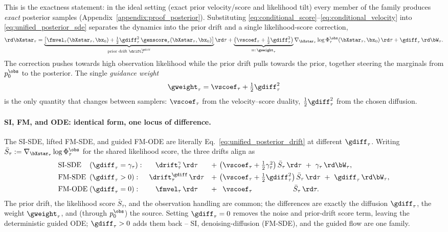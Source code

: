 This is the exactness statement: in the ideal setting (exact prior velocity/score and likelihood tilt) every member of the family produces \emph{exact} posterior samples (Appendix~\ref{appendix:proof_posterior}). Substituting \eqref{eq:conditional_score}--\eqref{eq:conditional_velocity} into \eqref{eq:unified_posterior_sde} separates the dynamics into the prior drift and a single likelihood-score correction,
\begin{align}\label{eq:unified_posterior_drift}
    \rd\bXstar_\tau
    = \underbrace{\left[\fmvel_\tau(\bXstar_\tau,\bx_0) + \tfrac12\gdiff_\tau^2\,\genscore_\tau(\bXstar_\tau,\bx_0)\right]}_{\text{prior drift }\drift^{\gdiff}_\tau}\rd\tau
    + \underbrace{\left(\vscoef_\tau + \tfrac12\gdiff_\tau^2\right)}_{=:\,\gweight_\tau}\nabla_{\bXstar_\tau}\log\Phi_\tau^{\obs}(\bXstar_\tau,\bx_0)\,\rd\tau
    + \gdiff_\tau\,\rd\bW_\tau .
\end{align}
The correction pushes towards high observation likelihood while the prior drift pulls towards the prior, together steering the marginals from $p_0^{\obs}$ to the posterior. The single \emph{guidance weight}
\begin{align}\label{eq:guidance_weight}
    \gweight_\tau = \vscoef_\tau + \tfrac12\gdiff_\tau^2
\end{align}
is the only quantity that changes between samplers: $\vscoef_\tau$ from the velocity--score duality, $\tfrac12\gdiff_\tau^2$ from the chosen diffusion.

\paragraph{SI, FM, and ODE: identical form, one locus of difference.}
The SI-SDE, lifted FM-SDE, and guided FM-ODE are literally Eq.~\eqref{eq:unified_posterior_drift} at different $\gdiff_\tau$. Writing $\bar S_\tau:=\nabla_{\bXstar_\tau}\log\Phi_\tau^{\obs}$ for the shared likelihood score, the three drifts align as
\begin{align}\label{eq:three_drifts}
\begin{array}{l@{\;}l@{\quad}c@{\quad}l}
\text{SI-SDE} &(\gdiff_\tau=\gamma_\tau): &
  \drift^{\gamma}_\tau\,\rd\tau
  &+\ \big(\vscoef_\tau+\tfrac12\gamma_\tau^2\big)\,\bar S_\tau\,\rd\tau\ +\ \gamma_\tau\,\rd\bW_\tau, \\[4pt]
\text{FM-SDE} &(\gdiff_\tau>0): &
  \drift^{\gdiff}_\tau\,\rd\tau
  &+\ \big(\vscoef_\tau+\tfrac12\gdiff_\tau^2\big)\,\bar S_\tau\,\rd\tau\ +\ \gdiff_\tau\,\rd\bW_\tau, \\[4pt]
\text{FM-ODE} &(\gdiff_\tau=0): &
  \fmvel_\tau\,\rd\tau
  &+\ \phantom{\big(}\vscoef_\tau\phantom{+\tfrac12\gdiff_\tau^2\big)}\,\bar S_\tau\,\rd\tau.
\end{array}
\end{align}
The prior drift, the likelihood score $\bar S_\tau$, and the observation handling are common; the differences are exactly the diffusion $\gdiff_\tau$, the weight $\gweight_\tau$, and (through $p_0^{\obs}$) the source. Setting $\gdiff_\tau=0$ removes the noise and prior-drift score term, leaving the deterministic guided ODE; $\gdiff_\tau>0$ adds them back -- SI, denoising-diffusion (FM-SDE), and the guided flow are one family.

